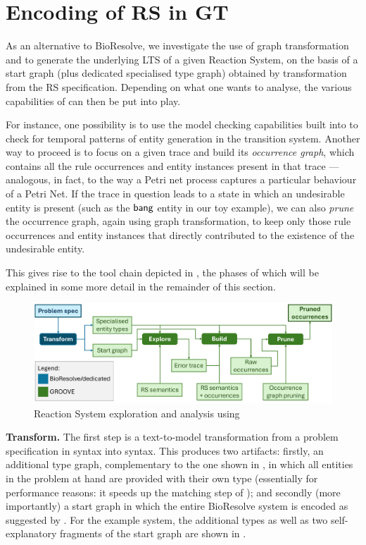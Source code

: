 
\section{Encoding of RS in GT}\label{sec:RS2GTS}

As an alternative to BioResolve, we investigate the use of graph transformation and \GROOVE to generate the underlying LTS of a given Reaction System, on the basis of a start graph (plus dedicated specialised type graph) obtained by transformation from the RS specification. Depending on what one wants to analyse, the various capabilities of \GROOVE can then be put into play.

For instance, one possibility is to use the model checking capabilities built into \GROOVE to check for temporal patterns of entity generation in the transition system. Another way to proceed is to focus on a given trace and build its \emph{occurrence graph}, which contains all the rule occurrences and entity instances present in that trace --- analogous, in fact, to the way a Petri net process captures a particular behaviour of a Petri Net. If the trace in question leads to a state in which an undesirable entity is present (such as the ${\text{\sffamily bang}}$ entity in our toy example), we can also \emph{prune} the occurrence graph, again using graph transformation, to keep only those rule occurrences and entity instances that directly contributed to the existence of the undesirable entity.

This gives rise to the tool chain depicted in , the phases of which will be explained in some more detail in the remainder of this section.	

\begin{figure}
\centering
\includegraphics[scale=.25]{figs/chain}
\caption{Reaction System exploration and analysis using \GROOVE}
\label{fig:chain}
\end{figure}

\medskip\noindent\textbf{Transform.}
%
The first step is a text-to-model transformation from a problem specification in \BioResolve syntax into \GROOVE syntax. This produces two artifacts: firstly, an additional type graph, complementary to the one shown in , in which all entities in the problem at hand are provided with their own type (essentially for performance reasons: it speeds up the matching step of \GROOVE); and secondly (more importantly) a start graph in which the entire BioResolve system is encoded as suggested by . For the example system, the additional types as well as two self-explanatory fragments of the start graph are shown in .

